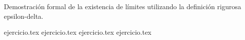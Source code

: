 
Demostración formal de la existencia de límites utilizando la definición rigurosa epsilon-delta.

\begin{enumerate}
    {ejercicio.tex}
    \setcounter{enumi}{6}
    {ejercicio.tex}
    \setcounter{enumi}{7}
    {ejercicio.tex}
    \setcounter{enumi}{14}
    {ejercicio.tex}
\end{enumerate}
